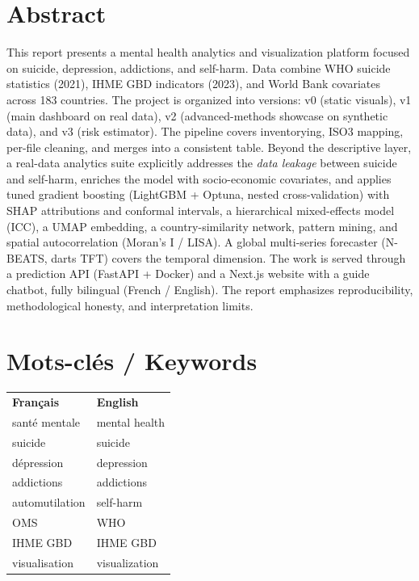 \section*{Abstract}
This report presents a mental health analytics and visualization platform focused on suicide, depression, addictions, and self-harm. Data combine WHO suicide statistics (2021), IHME GBD indicators (2023), and World Bank covariates across 183 countries. The project is organized into versions: v0 (static visuals), v1 (main dashboard on real data), v2 (advanced-methods showcase on synthetic data), and v3 (risk estimator). The pipeline covers inventorying, ISO3 mapping, per-file cleaning, and merges into a consistent table. Beyond the descriptive layer, a real-data analytics suite explicitly addresses the \emph{data leakage} between suicide and self-harm, enriches the model with socio-economic covariates, and applies tuned gradient boosting (LightGBM + Optuna, nested cross-validation) with SHAP attributions and conformal intervals, a hierarchical mixed-effects model (ICC), a UMAP embedding, a country-similarity network, pattern mining, and spatial autocorrelation (Moran's I / LISA). A global multi-series forecaster (N-BEATS, darts TFT) covers the temporal dimension. The work is served through a prediction API (FastAPI + Docker) and a Next.js website with a guide chatbot, fully bilingual (French / English). The report emphasizes reproducibility, methodological honesty, and interpretation limits.

\section*{Mots-clés / Keywords}
\begin{tabular}{p{} p{}}
\textbf{Français} & \textbf{English} \\
santé mentale & mental health \\
suicide & suicide \\
dépression & depression \\
addictions & addictions \\
automutilation & self-harm \\
OMS & WHO \\
IHME GBD & IHME GBD \\
visualisation & visualization \\
\end{tabular}
